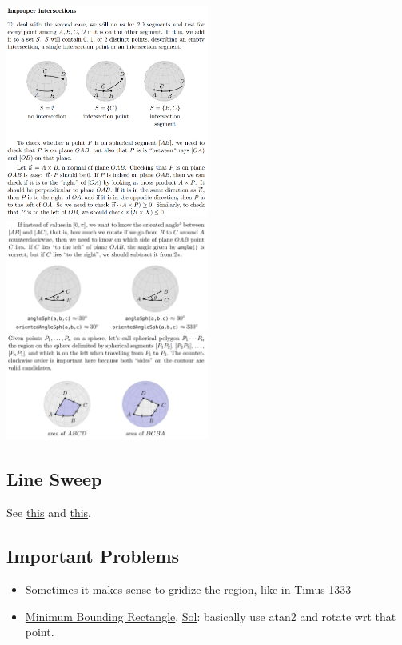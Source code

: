 \documentclass[8pt, a4paper, oneside, twocolumn]{extarticle}
\begin{document}
\\\includegraphics[width=0.5\textwidth,height=0.5\textheight,keepaspectratio]{segsegcir3}
\\\includegraphics[width=0.5\textwidth,height=0.5\textheight,keepaspectratio]{orientedangle}
\\\includegraphics[width=0.5\textwidth,height=0.5\textheight,keepaspectratio]{spherearea}
\subsection{Line Sweep}
See \href{https://www.topcoder.com/community/competitive-programming/tutorials/line-sweep-algorithms/}{this} and \href{https://github.com/sourabh2311/Competitive-Programming/blob/master/RevisionNotes/linesweep.pdf}{this}.
\subsection{Important Problems}
\begin{itemize}
    \item Sometimes it makes sense to gridize the region, like in \href{https://github.com/sourabh2311/Competitive-Programming/blob/master/timus/1333.cpp}{Timus 1333}
    \item \href{https://uva.onlinejudge.org/external/101/10173.pdf}{Minimum Bounding Rectangle}, \href{https://github.com/sourabh2311/Competitive-Programming/blob/master/UVA_10173.cpp}{Sol}: basically use atan2 and rotate wrt that point.
\end{itemize}
\end{document}
